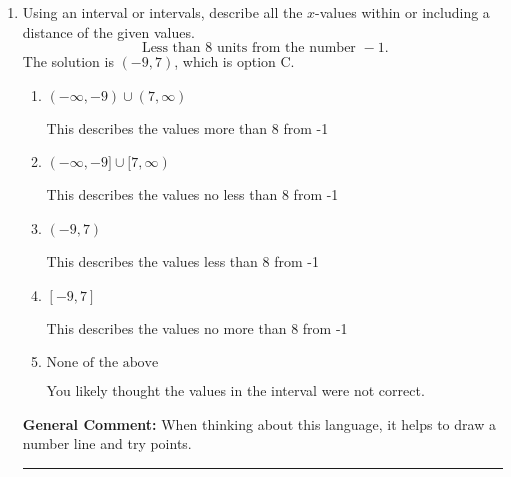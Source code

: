 \documentclass{extbook}[14pt]
\newcommand{\litem}[1]{\item #1

\rule{\textwidth}{0.4pt}}
\begin{document}
\begin{enumerate}
{\textbf{General Comment:} Remember that less/greater than or equal to includes the endpoint, while less/greater do not. Also, remember that you need to flip the inequality when you multiply or divide by a negative.
}
\litem{
Using an interval or intervals, describe all the $x$-values within or including a distance of the given values.
\[ \text{ Less than } 8 \text{ units from the number } -1. \]The solution is \( (-9, 7) \), which is option C.\begin{enumerate}[label=\Alph*.]
\item \( (-\infty, -9) \cup (7, \infty) \)

This describes the values more than 8 from -1
\item \( (-\infty, -9] \cup [7, \infty) \)

This describes the values no less than 8 from -1
\item \( (-9, 7) \)

This describes the values less than 8 from -1
\item \( [-9, 7] \)

This describes the values no more than 8 from -1
\item \( \text{None of the above} \)

You likely thought the values in the interval were not correct.
\end{enumerate}

\textbf{General Comment:} When thinking about this language, it helps to draw a number line and try points.
}
\end{enumerate}
\end{document}
